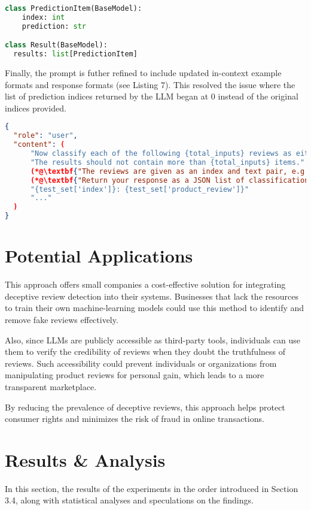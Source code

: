\documentclass[sigconf, nonacm]{acmart}
\theoremstyle{definition}
\begin{document}
\begin{lstlisting}[language=Python, caption={Final Response Format}]
class PredictionItem(BaseModel):
    index: int
    prediction: str

class Result(BaseModel):
  results: list[PredictionItem]
\end{lstlisting}

Finally, the prompt is futher refined to include updated in-context example formats and response formats (see Listing 7). This resolved the issue where the list of prediction indices returned by the LLM began at 0 instead of the original indices provided.

\begin{lstlisting}[language=json, caption={Final User Messages}]
{
  "role": "user",
  "content": (
      "Now classify each of the following {total_inputs} reviews as either 'truthful' or 'deceptive'. "
      "The results should not contain more than {total_inputs} items."
      (*@\textbf{"The reviews are given as an index and text pair, e.g. '123: This is a review.'"}@*)
      (*@\textbf{"Return your response as a JSON list of classifications paired with an index, e.g. [{'123': 'truthful'}, {'456': 'deceptive'}, ...]."}@*)
      "{test_set['index']}: {test_set['product_review']}"
      "..."
  )
}
\end{lstlisting}

\section{Potential Applications}

This approach offers small companies a cost-effective solution for integrating deceptive review detection into their systems. Businesses that lack the resources to train their own machine-learning models could use this method to identify and remove fake reviews effectively.

Also, since LLMs are publicly accessible as third-party tools, individuals can use them to verify the credibility of reviews when they doubt the truthfulness of reviews. Such accessibility could prevent individuals or organizations from manipulating product reviews for personal gain, which leads to a more transparent marketplace.

By reducing the prevalence of deceptive reviews, this approach helps protect consumer rights and minimizes the risk of fraud in online transactions.

\section{Results \& Analysis}
In this section, the results of the experiments in the order introduced in Section 3.4, along with statistical analyses and speculations on the findings.
\end{document}
